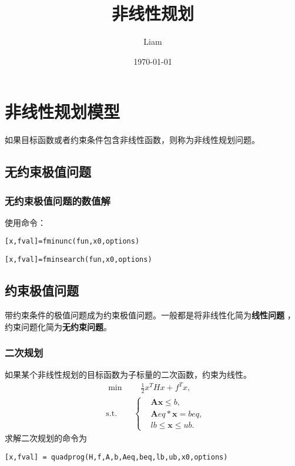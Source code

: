 \documentclass[11pt,a4paper]{ctexart}
\title{非线性规划}
\author{Liam}
\date{\today}
\begin{document}
\maketitle



\section{非线性规划模型}
如果目标函数或者约束条件包含非线性函数，则称为非线性规划问题。

\subsection{无约束极值问题}
\subsubsection{无约束极值问题的数值解}
使用命令：
\par 
\colorbox{mygrey}{\color{myred}\lstinline|[x,fval]=fminunc(fun,x0,options)|}
\par
\colorbox{mygrey}{\color{myred}\lstinline|[x,fval]=fminsearch(fun,x0,options)|}



\subsection{约束极值问题}
带约束条件的极值问题成为约束极值问题。一般都是将非线性化简为\textbf{线性问题} ，约束问题化简为\textbf{无约束问题}。
\subsubsection{二次规划}
如果某个非线性规划的目标函数为子标量的二次函数，约束为线性。
\[
\begin{aligned}
    & \min \qquad \frac{1}{2}x^THx+f^Tx , \\
    & \text{s.t.} \qquad \left\{
        \begin{array}{rl}
            & \boldsymbol{A}\boldsymbol{x} \le b,\\
            & \boldsymbol{A}eq*\boldsymbol{x}=beq,\\
            &lb \le \boldsymbol{x} \le ub.
        \end{array} \right.
\end{aligned}  
\]
求解二次规划的命令为
\par
\colorbox{mygrey}{\color{myred}\lstinline|[x,fval] = quadprog(H,f,A,b,Aeq,beq,lb,ub,x0,options)|}
\end{document}
